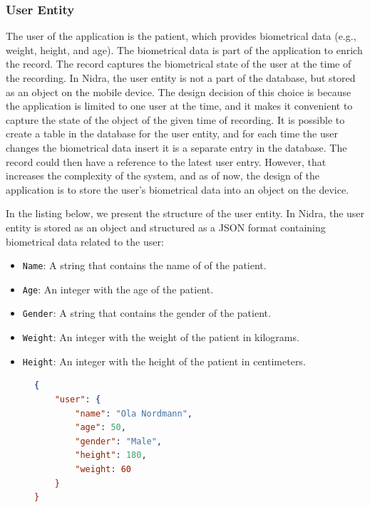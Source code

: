 \subsubsection{User Entity} \label{ssec:user}
The user of the application is the patient, which provides biometrical data (e.g., weight, height, and age). The biometrical data is part of the application to enrich the record. The record captures the biometrical state of the user at the time of the recording. In Nidra, the user entity is not a part of the database, but stored as an object on the mobile device. The design decision of this choice is because the application is limited to one user at the time, and it makes it convenient to capture the state of the object of the given time of recording. It is possible to create a table in the database for the user entity, and for each time the user changes the biometrical data insert it is a separate entry in the database. The record could then have a reference to the latest user entry. However, that increases the complexity of the system, and as of now, the design of the application is to store the user's biometrical data into an object on the device. 

In the listing below, we present the structure of the user entity. In Nidra, the user entity is stored as an object and structured as a JSON format containing biometrical data related to the user: 
\begin{itemize}
    \item \verb|Name|: A string that contains the name of of the patient.
    \item \verb|Age|: An integer with the age of the patient.
    \item \verb|Gender|: A string that contains the gender of the patient.
    \item \verb|Weight|: An integer with the weight of the patient in kilograms.
    \item \verb|Height|: An integer with the height of the patient in centimeters.
\end{itemize}

\begin{figure}[!h]
\begin{lstlisting}[language=json, caption={}, captionpos=b]
{
    "user": {
        "name": "Ola Nordmann",
        "age": 50,
        "gender": "Male",
        "height": 180,
        "weight: 60
    }
}
\end{lstlisting}
\end{figure}



